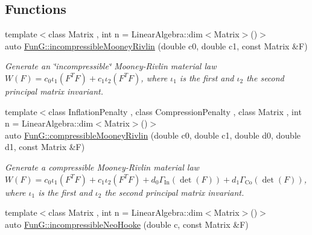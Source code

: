 \subsection*{Functions}
\begin{DoxyCompactItemize}
\item 
\hypertarget{group__Rubber_gace19173e33490aadd36ae3a03fd1d85c}{{\footnotesize template$<$class Matrix , int n = Linear\-Algebra\-::dim$<$\-Matrix$>$()$>$ }\\auto \hyperlink{group__Rubber_gace19173e33490aadd36ae3a03fd1d85c}{Fun\-G\-::incompressible\-Mooney\-Rivlin} (double c0, double c1, const Matrix \&F)}\label{group__Rubber_gace19173e33490aadd36ae3a03fd1d85c}

\begin{DoxyCompactList}\small\item\em Generate an \char`\"{}incompressible\char`\"{} Mooney-\/\-Rivlin material law $ W(F)=c_0\iota_1(F^T F) + c_1\iota_2(F^T F) $, where $\iota_1$ is the first and $\iota_2$ the second principal matrix invariant. \end{DoxyCompactList}\item 
\hypertarget{group__Rubber_ga9a1894daa10a0bdcc620c6c41ecb6f19}{{\footnotesize template$<$class Inflation\-Penalty , class Compression\-Penalty , class Matrix , int n = Linear\-Algebra\-::dim$<$\-Matrix$>$()$>$ }\\auto \hyperlink{group__Rubber_ga9a1894daa10a0bdcc620c6c41ecb6f19}{Fun\-G\-::compressible\-Mooney\-Rivlin} (double c0, double c1, double d0, double d1, const Matrix \&F)}\label{group__Rubber_ga9a1894daa10a0bdcc620c6c41ecb6f19}

\begin{DoxyCompactList}\small\item\em Generate a compressible Mooney-\/\-Rivlin material law $ W(F)=c_0\iota_1(F^T F) + c_1\iota_2(F^T F) + d_0\Gamma_\mathrm{In}(\det(F))+d_1\Gamma_\mathrm{Co}(\det(F)) $, where $\iota_1$ is the first and $\iota_2$ the second principal matrix invariant. \end{DoxyCompactList}\item 
\hypertarget{group__Rubber_ga5bb28aef7006413775791998936d6b81}{{\footnotesize template$<$class Matrix , int n = Linear\-Algebra\-::dim$<$\-Matrix$>$()$>$ }\\auto \hyperlink{group__Rubber_ga5bb28aef7006413775791998936d6b81}{Fun\-G\-::incompressible\-Neo\-Hooke} (double c, const Matrix \&F)}\label{group__Rubber_ga5bb28aef7006413775791998936d6b81}


\end{DoxyCompactItemize}
